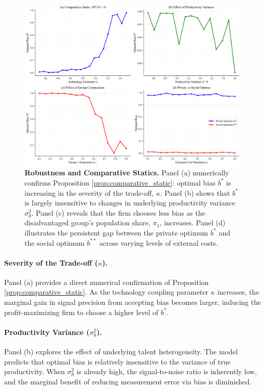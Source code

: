 \documentclass[12pt,a4paper]{article}
\theoremstyle{definition}
\theoremstyle{remark}
\begin{document}
\begin{figure}[H]
    \centering
    \includegraphics[width=\textwidth]{../figures/figure_robustness.png}
    \caption[Robustness and Comparative Statics]{\textbf{Robustness and Comparative Statics.} 
    Panel (a) numerically confirms Proposition \ref{prop:comparative_static}: optimal bias $b^*$ is increasing in the severity of the trade-off, $\kappa$.
    Panel (b) shows that $b^*$ is largely insensitive to changes in underlying productivity variance $\sigma^2_\theta$.
    Panel (c) reveals that the firm chooses less bias as the disadvantaged group's population share, $\pi_1$, increases.
    Panel (d) illustrates the persistent gap between the private optimum $b^*$ and the social optimum $b^{**}$ across varying levels of external costs.}
    \label{fig:robustness}
\end{figure}

\paragraph{Severity of the Trade-off ($\kappa$).} Panel (a) provides a direct numerical confirmation of Proposition \ref{prop:comparative_static}. As the technology coupling parameter $\kappa$ increases, the marginal gain in signal precision from accepting bias becomes larger, inducing the profit-maximizing firm to choose a higher level of $b^*$.

\paragraph{Productivity Variance ($\sigma^2_\theta$).} Panel (b) explores the effect of underlying talent heterogeneity. The model predicts that optimal bias is relatively insensitive to the variance of true productivity. When $\sigma^2_\theta$ is already high, the signal-to-noise ratio is inherently low, and the marginal benefit of reducing measurement error via bias is diminished.
\end{document}
